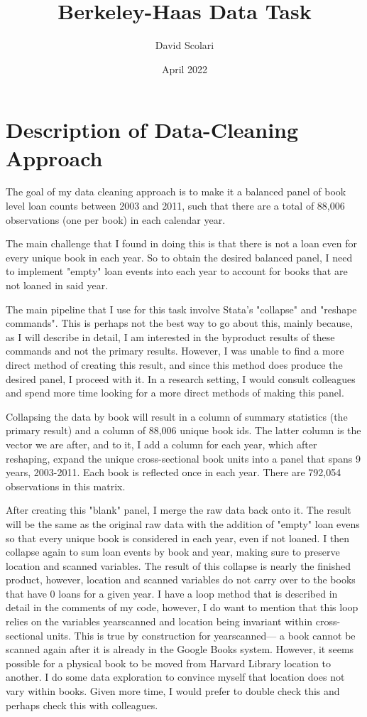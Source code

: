 \documentclass{article}
\author{David Scolari}
\title{Berkeley-Haas Data Task}
\date{April 2022}
\begin{document}
\maketitle
\section*{Description of Data-Cleaning Approach}
The goal of my data cleaning approach is to make it a balanced panel of book level loan counts between 2003 and 2011, such that there are a total of 88,006 observations (one per book) in each calendar year. 

The main challenge that I found in doing this is that there is not a loan even for every unique book in each year. So to obtain the desired balanced panel, I need to implement "empty" loan events into each year to account for books that are not loaned in said year. 

The main pipeline that I use for this task involve Stata's "collapse" and "reshape commands". This is perhaps not the best way to go about this, mainly because, as I will describe in detail, I am interested in the byproduct results of these commands and not the primary results. However, I was unable to find a more direct method of creating this result, and since this method does produce the desired panel, I proceed with it. In a research setting, I would consult colleagues and spend more time looking for a more direct methods of making this panel. 

Collapsing the data by book will result in a column of summary statistics (the primary result) and a column of 88,006 unique book ids. The latter column is the vector we are after, and to it, I add a column for each year, which after reshaping, expand the unique cross-sectional book units into a panel that spans 9 years, 2003-2011. Each book is reflected once in each year. There are 792,054 observations in this matrix. 

After creating this "blank" panel, I merge the raw data back onto it. The result will be the same as the original raw data with the addition of "empty" loan evens so that every unique book is considered in each year, even if not loaned. I then collapse again to sum loan events by book and year, making sure to preserve location and scanned variables. The result of this collapse is nearly the finished product, however, location and scanned variables do not carry over to the books that have 0 loans for a given year. I have a loop method that is described in detail in the comments of my code, however, I do want to mention that this loop relies on the variables yearscanned and location being invariant within cross-sectional units. This is true by construction for yearscanned--- a book cannot be scanned again after it is already in the Google Books system. However, it seems possible for a physical book to be moved from Harvard Library location to another. I do some data exploration to convince myself that location does not vary within books. Given more time, I would prefer to double check this and perhaps check this with colleagues.
\end{document}
